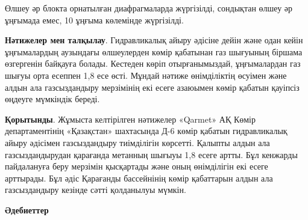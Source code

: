 \begin{multicols}{2}
Өлшеу әр блокта орнатылған диафрагмаларда жүргізілді, сондықтан өлшеу әр
ұңғымада емес, 10 ұңғыма көлемінде жүргізілді.

{\bfseries Нәтижелер мен талқылау}. Гидравликалық айыру әдісіне дейін және
одан кейін ұңғымалардың аузындағы өлшеулерден көмір қабатынан газ
шығуының біршама өзгергенін байқауға болады. Кестеден көріп
отырғанымыздай, ұңғымалардан газ шығуы орта есеппен 1,8 есе өсті. Мұндай
нәтиже өнімділіктің өсуімен және алдын ала газсыздандыру мерзімінің екі
есеге азаюымен көмір қабатын қауіпсіз өңдеуге мүмкіндік береді.

{\bfseries Қорытынды}. Жұмыста келтірілген нәтижелер «Qarmet» АҚ Көмір
департаментінің «Қазақстан» шахтасында Д-6 көмір қабатын гидравликалық
айыру әдісімен газсыздандыру тиімділігін көрсетті. Қалыпты алдын ала
газсыздандырудан қарағанда метанның шығыуы 1,8 есеге артты. Бұл кенжарды
пайдалануға беру мерзімін қысқартады және оның өнімділігін екі есеге
арттырады. Бұл әдіс Қарағанды бассейнінің көмір қабаттарын алдын ала
газсыздандыру кезінде сәтті қолданылуы мүмкін.
\end{multicols}

\begin{center}
{\bfseries Әдебиеттер}
\end{center}

